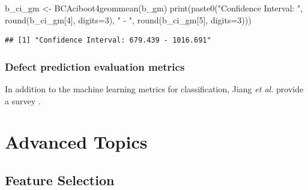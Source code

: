 \documentclass[
]{book}
\newenvironment{Shaded}{\begin{snugshade}}{\end{snugshade}}
\newcommand{\AttributeTok}[1]{\textcolor[rgb]{0.77,0.63,0.00}{#1}}
\newcommand{\CommentTok}[1]{\textcolor[rgb]{0.56,0.35,0.01}{\textit{#1}}}
\newcommand{\DecValTok}[1]{\textcolor[rgb]{0.00,0.00,0.81}{#1}}
\newcommand{\FunctionTok}[1]{\textcolor[rgb]{0.00,0.00,0.00}{#1}}
\newcommand{\NormalTok}[1]{#1}
\newcommand{\OtherTok}[1]{\textcolor[rgb]{0.56,0.35,0.01}{#1}}
\newcommand{\StringTok}[1]{\textcolor[rgb]{0.31,0.60,0.02}{#1}}
\begin{document}
\begin{Shaded}
\begin{Highlighting}[]
\NormalTok{b\_ci\_gm }\OtherTok{\textless{}{-}} \FunctionTok{BCAciboot4geommean}\NormalTok{(b\_gm)}
\FunctionTok{print}\NormalTok{(}\FunctionTok{paste0}\NormalTok{(}\StringTok{"Confidence Interval: "}\NormalTok{, }\FunctionTok{round}\NormalTok{(b\_ci\_gm[}\DecValTok{4}\NormalTok{], }\AttributeTok{digits=}\DecValTok{3}\NormalTok{), }\StringTok{" {-} "}\NormalTok{, }\FunctionTok{round}\NormalTok{(b\_ci\_gm[}\DecValTok{5}\NormalTok{], }\AttributeTok{digits=}\DecValTok{3}\NormalTok{)))}
\end{Highlighting}
\end{Shaded}

\begin{verbatim}
## [1] "Confidence Interval: 679.439 - 1016.691"
\end{verbatim}

\begin{Shaded}
\end{Shaded}

\hypertarget{defect-prediction-evaluation-metrics}{%
\section{Defect prediction evaluation metrics}\label{defect-prediction-evaluation-metrics}}

In addition to the machine learning metrics for classification, Jiang \emph{et al.} provide a survey \citep{Jiang2008}.

\hypertarget{part-advanced-topics}{%
\part{Advanced Topics}\label{part-advanced-topics}}

\hypertarget{feature-selection}{%
\chapter{Feature Selection}\label{feature-selection}}
\end{document}

